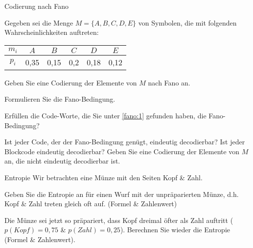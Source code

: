 \documentclass{exercisesheet}
\begin{document}


\begin{exercise*}{Codierung nach Fano}{
    Gegeben sei die Menge $M = \{A, B, C, D, E\}$ von Symbolen, die mit folgenden Wahrscheinlichkeiten auftreten:
    \centering\begin{tabular}{c|ccccc}
      $m_i$ & $A$  & $B$  & $C$ & $D$  & $E$  \\
      \hline
      $p_i$ & 0,35 & 0,15 & 0,2 & 0,18 & 0,12 \\
    \end{tabular}
  }
  \item\label{fano:1} Geben Sie eine Codierung der Elemente von $M$ nach Fano an.
  \item Formulieren Sie die Fano-Bedingung.
  \item Erfüllen die Code-Worte, die Sie unter \ref{fano:1} gefunden haben, die Fano-Bedingung?
  \item Ist jeder Code, der der Fano-Bedingung genügt, eindeutig decodierbar? Ist jeder Blockcode eindeutig decodierbar? Geben Sie eine Codierung der Elemente von $M$ an, die nicht eindeutig decodierbar ist.

\end{exercise*}

\begin{exercise*}{Entropie}{
    Wir betrachten eine Münze mit den Seiten Kopf \& Zahl.
  }
  \item Geben Sie die Entropie an für einen Wurf mit der unpräparierten Münze, d.h. Kopf \& Zahl treten gleich oft auf. (Formel \& Zahlenwert)
  \item Die Münze sei jetzt so präpariert, dass Kopf dreimal öfter als Zahl auftritt ($p(Kopf) = 0,75$ \& $p(Zahl) = 0,25$). Berechnen Sie wieder die Entropie (Formel \& Zahlenwert).
\end{exercise*}
\end{document}
